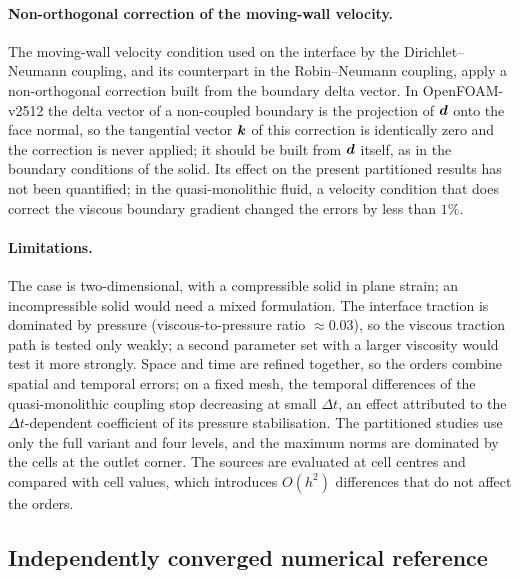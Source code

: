 \paragraph{Non-orthogonal correction of the moving-wall velocity.}
The moving-wall velocity condition used on the interface by the Dirichlet--Neumann coupling, and its counterpart in the Robin--Neumann coupling, apply a non-orthogonal correction built from the boundary delta vector.
In OpenFOAM-v2512 the delta vector of a non-coupled boundary is the projection of $\boldsymbol{d}$ onto the face normal, so the tangential vector $\boldsymbol{k}$ of this correction is identically zero and the correction is never applied; it should be built from $\boldsymbol{d}$ itself, as in the boundary conditions of the solid.
Its effect on the present partitioned results has not been quantified; in the quasi-monolithic fluid, a velocity condition that does correct the viscous boundary gradient changed the errors by less than $1\%$.

\paragraph{Limitations.}
The case is two-dimensional, with a compressible solid in plane strain; an incompressible solid would need a mixed formulation.
The interface traction is dominated by pressure (viscous-to-pressure ratio $\approx0.03$), so the viscous traction path is tested only weakly; a second parameter set with a larger viscosity would test it more strongly.
Space and time are refined together, so the orders combine spatial and temporal errors; on a fixed mesh, the temporal differences of the quasi-monolithic coupling stop decreasing at small $\Delta t$, an effect attributed to the $\Delta t$-dependent coefficient of its pressure stabilisation.
The partitioned studies use only the full variant and four levels, and the maximum norms are dominated by the cells at the outlet corner.
The sources are evaluated at cell centres and compared with cell values, which introduces $O(h^2)$ differences that do not affect the orders.


\subsection{Independently converged numerical reference}\label{sec:independent_refs}

